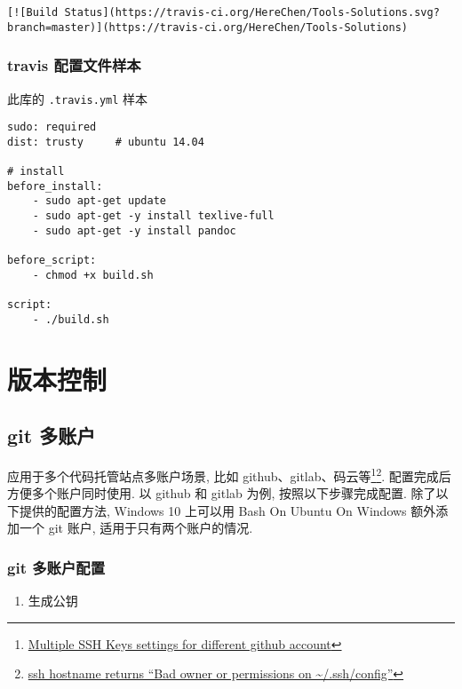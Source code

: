 \begin{lstlisting}
[![Build Status](https://travis-ci.org/HereChen/Tools-Solutions.svg?branch=master)](https://travis-ci.org/HereChen/Tools-Solutions)
\end{lstlisting}

\subsubsection{travis
配置文件样本}\label{travis-ux914dux7f6eux6587ux4ef6ux6837ux672c}

此库的 \lstinline!.travis.yml! 样本

\begin{lstlisting}
sudo: required
dist: trusty     # ubuntu 14.04

# install
before_install:
    - sudo apt-get update
    - sudo apt-get -y install texlive-full
    - sudo apt-get -y install pandoc

before_script:
    - chmod +x build.sh

script:
    - ./build.sh
\end{lstlisting}

\section{版本控制}\label{ux7248ux672cux63a7ux5236}

\subsection{git 多账户}\label{git-ux591aux8d26ux6237}

应用于多个代码托管站点多账户场景, 比如 github、gitlab、码云等\footnote{\href{https://gist.github.com/jexchan/2351996}{Multiple
  SSH Keys settings for different github account}}\footnote{\href{https://serverfault.com/questions/253313/ssh-hostname-returns-bad-owner-or-permissions-on-ssh-config}{ssh
  hostname returns ``Bad owner or permissions on
  \textasciitilde{}/.ssh/config''}}. 配置完成后方便多个账户同时使用. 以
github 和 gitlab 为例, 按照以下步骤完成配置. 除了以下提供的配置方法,
Windows 10 上可以用 Bash On Ubuntu On Windows 额外添加一个 git 账户,
适用于只有两个账户的情况.

\subsubsection{git 多账户配置}\label{git-ux591aux8d26ux6237ux914dux7f6e}

\begin{enumerate}
\def\labelenumi{\arabic{enumi}.}
\tightlist
\item
  生成公钥
\end{enumerate}

